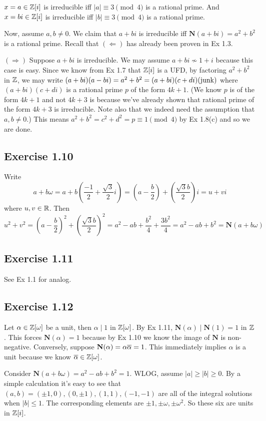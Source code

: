 \documentclass[../Marcus.tex]{subfiles}
\begin{document}
$x=a\in\mathbb{Z}[i]$ is irreducible iff $|a|\equiv 3\pmod{4}$ is a rational prime. And $x=bi\in\mathbb{Z}[i]$ is irreducible iff $|b|\equiv 3\pmod{4}$ is a rational prime.

Now, assume $a,b\neq 0$. We claim that $a+bi$ is irreducible iff $\mathbf{N}(a+bi)=a^2+b^2$ is a rational prime. Recall that $(\Leftarrow)$ has already been proven in Ex 1.3.

$(\Rightarrow)$ Suppose $a+bi$ is irreducible. We may assume $a+bi\not\sim 1+i$ because this case is easy. Since we know from Ex 1.7 that $\mathbb{Z}[i]$ is a UFD, by factoring $a^2+b^2$ in $\mathbb{Z}$, we may write $(a+bi)(a-bi)=a^2+b^2=(a+bi)(c+di)(\operatorname{junk})$ where $(a+bi)(c+di)$ is a rational prime $p$ of the form $4k+1$. (We know $p$ is of the form $4k+1$ and not $4k+3$ is because we've already shown that rational prime of the form $4k+3$ is irreducible. Note also that we indeed need the assumption that $a,b\neq 0$.) This means $a^2+b^2=c^2+d^2=p\equiv1\pmod{4}$ by Ex 1.8(c) and so we are done.

\subsection*{Exercise 1.10}

Write $$a+b\omega=a+b\left(\frac{-1}{2}+\frac{\sqrt{3}}{2}i\right)=\left(a-\frac{b}{2}\right)+\left(\frac{\sqrt{3}b}{2}\right)i=u+vi$$ where $u,v\in\mathbb{R}$. Then $$u^2+v^2=\left(a-\frac{b}{2}\right)^2+\left(\frac{\sqrt{3}b}{2}\right)^2=a^2-ab+\frac{b^2}{4}+\frac{3b^2}{4}=a^2-ab+b^2=\mathbf{N}(a+b\omega)$$

\subsection*{Exercise 1.11}

See Ex 1.1 for analog.

\subsection*{Exercise 1.12}

Let $\alpha\in\mathbb{Z}[\omega]$ be a unit, then $\alpha\mid 1$ in $\mathbb{Z}[\omega]$. By Ex 1.11, $\mathbf{N}(\alpha)\mid \mathbf{N}(1)=1$ in $\mathbb{Z}$. This forces $\mathbf{N}(\alpha)=1$ because by Ex 1.10 we know the image of $\mathbf{N}$ is non-negative. Conversely, suppose $\mathbf{N}(\alpha)=\alpha\overline{\alpha}=1$. This immediately implies $\alpha$ is a unit because we know $\overline{\alpha}\in\mathbb{Z}[\omega]$.

Consider $\mathbf{N}(a+b\omega)=a^2-ab+b^2=1$. WLOG, assume $|a|\geq|b|\geq0$. By a simple calculation it's easy to see that $(a,b)=(\pm1,0),(0,\pm1),(1,1),(-1,-1)$ are all of the integral solutions when $|b|\leq1$. The corresponding elements are $\pm1,\pm\omega,\pm\omega^2$. So these six are units in $\mathbb{Z}[i]$.
\end{document}
